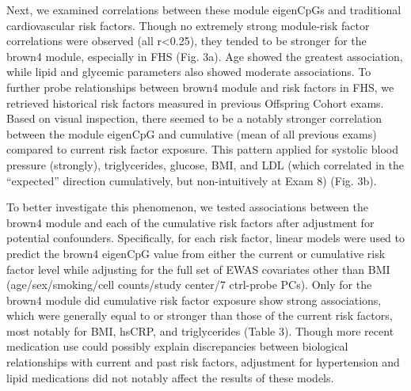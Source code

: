 \documentclass[]{article}
\theoremstyle{definition}
\theoremstyle{definition}
\theoremstyle{definition}
\theoremstyle{remark}
\begin{document}
Next, we examined correlations between these module eigenCpGs and
traditional cardiovascular risk factors. Though no extremely strong
module-risk factor correlations were observed (all
\textbar{}r\textbar{}\textless{}0.25), they tended to be stronger for
the brown4 module, especially in FHS (Fig. 3a). Age showed the greatest
association, while lipid and glycemic parameters also showed moderate
associations. To further probe relationships between brown4 module and
risk factors in FHS, we retrieved historical risk factors measured in
previous Offspring Cohort exams. Based on visual inspection, there
seemed to be a notably stronger correlation between the module eigenCpG
and cumulative (mean of all previous exams) compared to current risk
factor exposure. This pattern applied for systolic blood pressure
(strongly), triglycerides, glucose, BMI, and LDL (which correlated in
the ``expected'' direction cumulatively, but non-intuitively at Exam 8)
(Fig. 3b).

To better investigate this phenomenon, we tested associations between
the brown4 module and each of the cumulative risk factors after
adjustment for potential confounders. Specifically, for each risk
factor, linear models were used to predict the brown4 eigenCpG value
from either the current or cumulative risk factor level while adjusting
for the full set of EWAS covariates other than BMI (age/sex/smoking/cell
counts/study center/7 ctrl-probe PCs). Only for the brown4 module did
cumulative risk factor exposure show strong associations, which were
generally equal to or stronger than those of the current risk factors,
most notably for BMI, hsCRP, and triglycerides (Table 3). Though more
recent medication use could possibly explain discrepancies between
biological relationships with current and past risk factors, adjustment
for hypertension and lipid medications did not notably affect the
results of these models.
\end{document}
